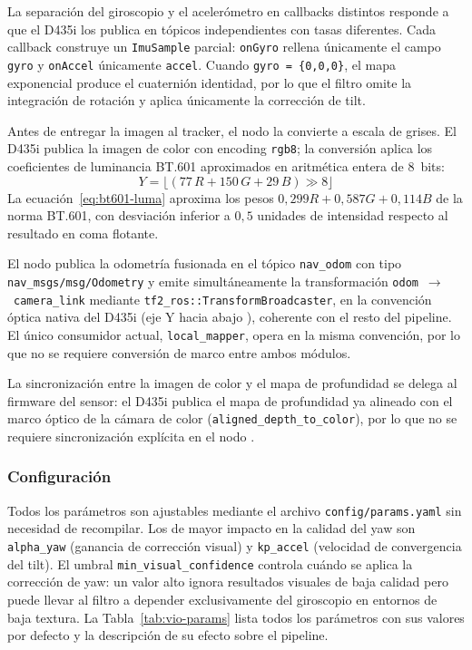La separación del giroscopio y el acelerómetro en callbacks distintos responde
a que el D435i los publica en tópicos independientes con tasas diferentes.
Cada callback construye un \texttt{ImuSample} parcial: \texttt{onGyro}
rellena únicamente el campo \texttt{gyro} y \texttt{onAccel} únicamente
\texttt{accel}. Cuando \texttt{gyro = \{0,0,0\}}, el mapa exponencial produce
el cuaternión identidad, por lo que el filtro omite la integración de rotación
y aplica únicamente la corrección de tilt.

Antes de entregar la imagen al tracker, el nodo la convierte a escala de
grises. El D435i publica la imagen de color con encoding \texttt{rgb8}; la
conversión aplica los coeficientes de luminancia BT.601 aproximados en
aritmética entera de 8~bits:
%
\begin{equation}
  \label{eq:bt601-luma}
  Y = \lfloor(77\,R + 150\,G + 29\,B) \gg 8\rfloor
\end{equation}
%
La ecuación~\ref{eq:bt601-luma} aproxima los pesos $0{,}299R + 0{,}587G +
0{,}114B$ de la norma BT.601, con desviación inferior a $0{,}5$ unidades de
intensidad respecto al resultado en coma flotante.

El nodo publica la odometría fusionada en el tópico \texttt{nav\_odom} con
tipo \texttt{nav\_msgs/msg/Odometry} y emite simultáneamente la transformación
\texttt{odom}~$\to$~\texttt{camera\_link} mediante
\texttt{tf2\_ros::TransformBroadcaster}, en la convención óptica nativa
del D435i (eje Y hacia abajo \cite{RS-D400}), coherente con el resto del
pipeline. El único consumidor actual, \texttt{local\_mapper}, opera en la
misma convención, por lo que no se requiere conversión de marco entre ambos
módulos.

La sincronización entre la imagen de color y el mapa de profundidad se delega
al firmware del sensor: el D435i publica el mapa de profundidad ya alineado
con el marco óptico de la cámara de color (\texttt{aligned\_depth\_to\_color}),
por lo que no se requiere sincronización explícita en el nodo \cite{RS-D400}.

\subsubsection{Configuración}

Todos los parámetros son ajustables mediante el archivo
\texttt{config/params.yaml} sin necesidad de recompilar. Los de mayor impacto
en la calidad del yaw son \texttt{alpha\_yaw} (ganancia de corrección visual) y
\texttt{kp\_accel} (velocidad de convergencia del tilt). El umbral
\texttt{min\_visual\_confidence} controla cuándo se aplica la corrección
de yaw: un valor alto ignora resultados visuales de baja calidad pero puede
llevar al filtro a depender exclusivamente del giroscopio en entornos de baja
textura. La Tabla~\ref{tab:vio-params} lista todos los parámetros con sus
valores por defecto y la descripción de su efecto sobre el pipeline.

